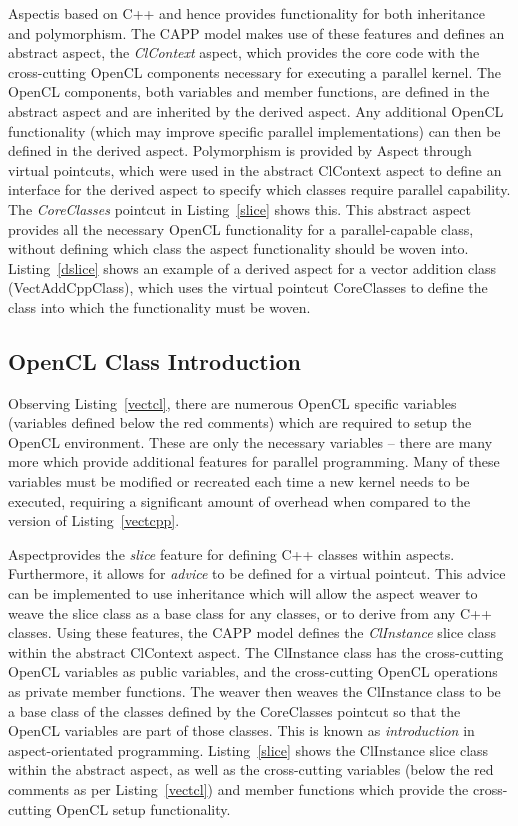 \documentclass{sig-alternate-05-2015}
\begin{document}
Aspect\CPP is based on C++ and hence provides functionality for both inheritance
and polymorphism. The CAPP model makes use of these features and defines
an abstract aspect, the \textit{ClContext} aspect, which provides the core \CPP code with 
the cross-cutting OpenCL components necessary for executing a parallel kernel.
The OpenCL  components, both variables and member functions, are defined in the abstract 
aspect and are inherited by the derived aspect. Any additional OpenCL
functionality (which may improve specific parallel implementations) can then be 
defined in the derived aspect. Polymorphism is provided by Aspect\CPP 
through virtual pointcuts, which were used in the abstract
ClContext aspect to define an interface for the derived aspect
to specify which \CPP classes require parallel capability.
The \textit{CoreClasses} pointcut in Listing~\ref{slice} shows this.
This abstract aspect provides all the necessary OpenCL functionality for a 
parallel-capable class, without defining which \CPP class 
the aspect functionality should be woven into. Listing~\ref{dslice} shows an
example of a derived aspect for a \CPP vector addition class (VectAddCppClass), 
which uses the virtual pointcut CoreClasses to define the \CPP class
into which the functionality must be woven.

\subsection{OpenCL Class Introduction}

Observing Listing~\ref{vectcl}, there are numerous OpenCL specific variables
(variables defined below the red comments) which are required to setup the 
OpenCL environment. These are only the necessary variables -- there are many
more which provide additional features for parallel programming.
Many of these variables must be modified or recreated each
time a new kernel needs to be executed, requiring a significant amount of 
overhead when compared to the \CPP version of Listing~\ref{vectcpp}.

Aspect\CPP provides the \textit{slice} feature for defining C++ classes within
aspects. Furthermore, it allows for \textit{advice} to be defined for a 
virtual pointcut. This advice can be implemented to use \CPP inheritance which
will allow the aspect weaver to weave the slice class as a base class for 
any \CPP classes, or to derive from any C++ classes. Using these features, the CAPP model defines the 
\textit{ClInstance} slice class within the abstract ClContext aspect.  
The ClInstance class has the cross-cutting OpenCL variables as public
variables, and the cross-cutting OpenCL operations as private member functions.
The weaver then weaves the ClInstance class to be a base class of the \CPP
classes defined by the CoreClasses pointcut so that the OpenCL variables 
are part of those \CPP classes. This is known as \textit{introduction} in
aspect-orientated programming.
Listing~\ref{slice} shows the ClInstance slice class within the abstract aspect,
as well as the cross-cutting variables (below the red comments as per 
Listing~\ref{vectcl}) and member functions which provide the cross-cutting
OpenCL setup functionality.
\end{document}

